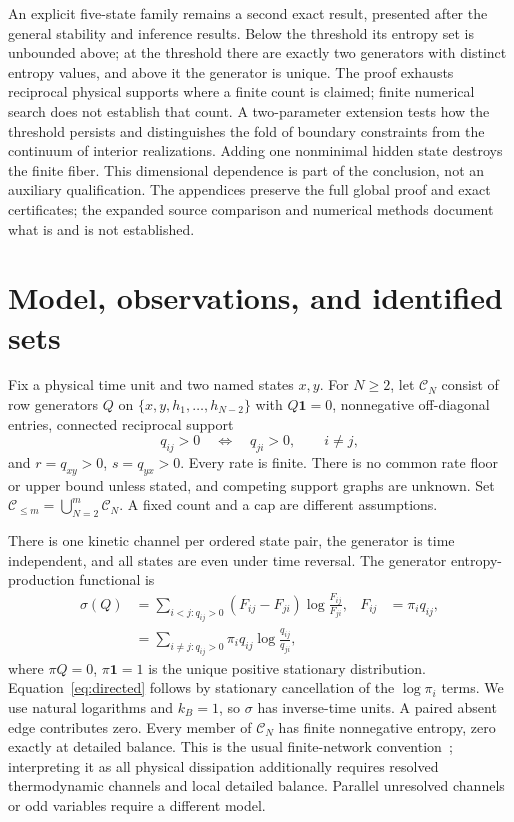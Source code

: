 \documentclass[aps,pre,onecolumn,11pt,longbibliography,notitlepage]{revtex4-2}
\newcommand{\1}{\mathbf 1}
\newcommand{\C}{\mathcal C}
\newcommand{\sig}{\sigma}
\begin{document}
An explicit five-state family remains a second exact result, presented after the general stability and inference results. Below the threshold its entropy set is unbounded above; at the threshold there are exactly two generators with distinct entropy values, and above it the generator is unique. The proof exhausts reciprocal physical supports where a finite count is claimed; finite numerical search does not establish that count. A two-parameter extension tests how the threshold persists and distinguishes the fold of boundary constraints from the continuum of interior realizations. Adding one nonminimal hidden state destroys the finite fiber. This dimensional dependence is part of the conclusion, not an auxiliary qualification. The appendices preserve the full global proof and exact certificates; the expanded source comparison and numerical methods document what is and is not established.



\section{Model, observations, and identified sets}\label{sec:model}
Fix a physical time unit and two named states $x,y$. For $N\ge2$, let $\C_N$ consist of row generators $Q$ on $\{x,y,h_1,\ldots,h_{N-2}\}$ with $Q\1=0$, nonnegative off-diagonal entries, connected reciprocal support
\begin{equation}
 q_{ij}>0\quad\Longleftrightarrow\quad q_{ji}>0,\qquad i\ne j,
\end{equation}
and $r=q_{xy}>0$, $s=q_{yx}>0$. Every rate is finite. There is no common rate floor or upper bound unless stated, and competing support graphs are unknown. Set $\C_{\le m}=\bigcup_{N=2}^m\C_N$. A fixed count and a cap are different assumptions.

There is one kinetic channel per ordered state pair, the generator is time independent, and all states are even under time reversal. The generator entropy-production functional is
\begin{align}
 \sig(Q)&=\sum_{i<j:q_{ij}>0}(F_{ij}-F_{ji})\log\frac{F_{ij}}{F_{ji}},
 &F_{ij}&=\pi_iq_{ij},\label{eq:entropy}\\
 &=\sum_{i\ne j:q_{ij}>0}\pi_iq_{ij}\log\frac{q_{ij}}{q_{ji}},\label{eq:directed}
\end{align}
where $\pi Q=0$, $\pi\1=1$ is the unique positive stationary distribution. Equation~\eqref{eq:directed} follows by stationary cancellation of the $\log\pi_i$ terms. We use natural logarithms and $k_B=1$, so $\sig$ has inverse-time units. A paired absent edge contributes zero. Every member of $\C_N$ has finite nonnegative entropy, zero exactly at detailed balance. This is the usual finite-network convention~\cite{Schnakenberg1976,NishiyamaHasegawa2023}; interpreting it as all physical dissipation additionally requires resolved thermodynamic channels and local detailed balance. Parallel unresolved channels or odd variables require a different model.
\end{document}
